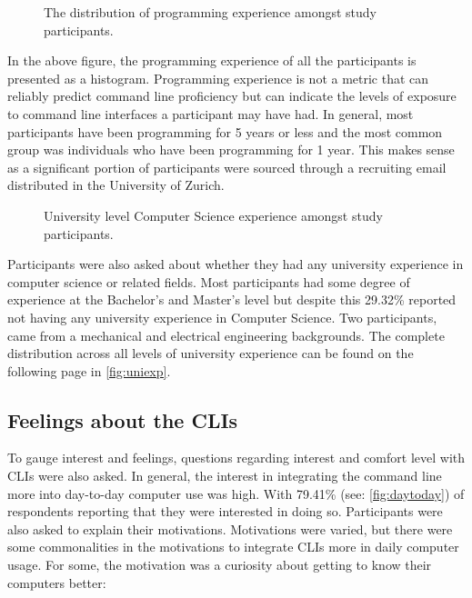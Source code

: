 \begin{figure}[H]
	\centering
	\scalebox{0.75}{}
	\caption{The distribution of programming experience amongst study participants.}
	\label{fig:programmingexp}
\end{figure}

In the above figure, the programming experience of all the participants is
presented as a histogram. Programming experience is not a metric that can
reliably predict command line proficiency but can indicate the levels of
exposure to command line interfaces a participant may have had. In general,
most participants have been programming for 5 years or less and the most common
group was individuals who have been programming for 1 year. This makes sense as
a significant portion of participants were sourced through a recruiting email
distributed in the University of Zurich.

\begin{figure}[h]
	\centering
	\scalebox{0.8}{}
	\caption{University level Computer Science experience amongst study participants.}
	\label{fig:uniexp}
\end{figure}

Participants were also asked about whether they had any university experience
in computer science or related fields. Most participants had some degree of
experience at the Bachelor's and Master's level but despite this 29.32\%
reported not having any university experience in Computer Science. Two
participants, came from a mechanical and electrical engineering backgrounds. The
complete distribution across all levels of university experience can be found
on the following page in \autoref{fig:uniexp}.

\FloatBarrier %


\subsection{Feelings about the CLIs}

To gauge interest and feelings, questions regarding interest and comfort level
with CLIs were also asked. In general, the interest in integrating the command
line more into day-to-day computer use was high. With 79.41\% (see:
\autoref{fig:daytoday}) of respondents reporting that they were interested in
doing so. Participants were also asked to explain their motivations.
Motivations were varied, but there were some commonalities in the motivations
to integrate CLIs more in daily computer usage. For some, the motivation was a
curiosity about getting to know their computers better:

